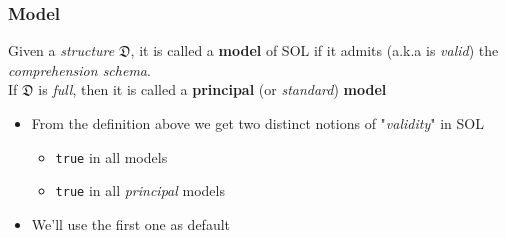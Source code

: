 \documentclass{beamer}
\begin{document}
                \begin{frame}
                    \frametitle{Model}
                    \begin{definition}[Model]
                        Given a \textit{structure} $ \mathfrak{D} $, it is called a \textbf{model} of SOL if it admits (a.k.a is \textit{valid}) the \textit{comprehension schema}.\\
                        If $ \mathfrak{D} $ is \textit{full}, then it is called a \textbf{principal} (or \textit{standard}) \textbf{model}
                    \end{definition}
                    \begin{itemize}
                        \item From the definition above we get two distinct notions of "\textit{validity}" in SOL
                              \begin{itemize}
                                \item \texttt{true} in all models
                                \item \texttt{true} in all \textit{principal} models
                              \end{itemize}
                        \item We'll use the first one as default
                    \end{itemize}
                \end{frame}
\end{document}

